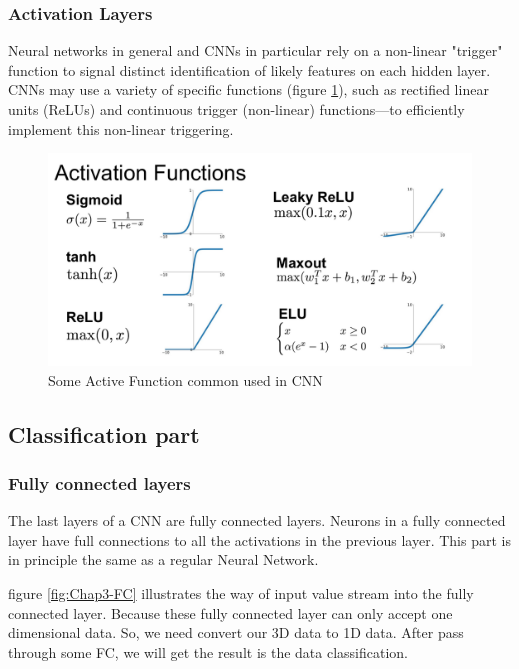 
\subsubsection{Activation Layers}
Neural networks in general and CNNs in particular rely on a non-linear "trigger" function
to signal distinct identification of likely features on each hidden layer. CNNs may use a
variety of specific functions (figure \ref{fig:Chap3-CNN_ActiveFunction}), such as rectified linear
units (ReLUs) and continuous trigger (non-linear) functions—to efficiently implement this non-linear triggering.
\begin{figure}[H]
	\centering
	\includegraphics[width=\textwidth]{img/Chap3/ActiveFunction}
	\caption{ Some Active Function common used in CNN }
	\label{fig:Chap3-CNN_ActiveFunction}
\end{figure}
\subsection{Classification part}
\subsubsection{Fully connected layers}
The last layers of a CNN are fully connected layers. Neurons in a
fully connected layer have full connections to all the activations in the previous
layer. This part is in principle the same as a regular Neural Network.

figure \ref{fig:Chap3-FC} illustrates the way of input value stream into the fully connected layer.
Because these fully connected layer can only accept one dimensional data. So, we need convert our 3D
data to 1D data. After pass through some FC, we will get the result is the data
classification.

